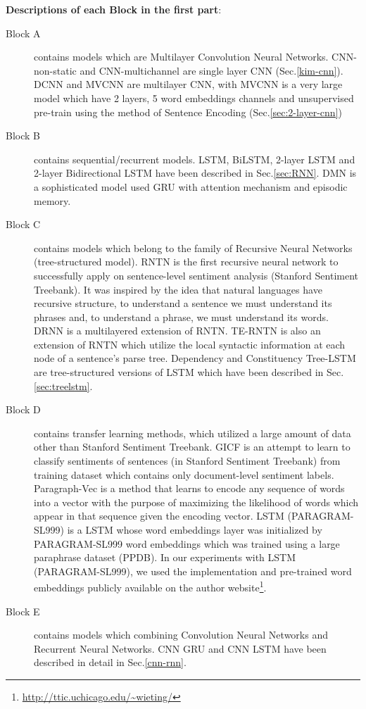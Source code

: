 \textbf{Descriptions of each Block in the first part}:
\begin{description}
\item[Block A] contains models which are Multilayer Convolution Neural Networks.  
CNN-non-static and CNN-multichannel\cite{KimCNN} are single layer CNN (Sec.\ref{kim-cnn}).
DCNN\cite{DCNN} and MVCNN\cite{2-layer-cnn} are multilayer CNN, with MVCNN is a very large model  which have 2 layers, 5 word embeddings channels and unsupervised pre-train using the method of Sentence Encoding (Sec.\ref{sec:2-layer-cnn})
\item[Block B] contains sequential/recurrent models. 
 LSTM\cite{originLSTM}, BiLSTM\cite{GravesLSTM}, 2-layer LSTM\cite{GravesLSTM} and 2-layer Bidirectional LSTM\cite{GravesLSTM} have been described in Sec.\ref{sec:RNN}.
DMN\cite{attention-gru} is a sophisticated model used GRU with attention mechanism and episodic memory.
\item[Block C] contains models which belong to the family of Recursive Neural Networks (tree-structured model). 
RNTN\cite{socher2013recursive} is the first recursive neural network to successfully apply on sentence-level sentiment analysis (Stanford Sentiment Treebank). 
It was inspired by the idea that natural languages have recursive structure, to understand a sentence we must understand its phrases and, to understand a phrase, we must understand its words. 
DRNN\cite{IrsoyDRNN} is a multilayered extension of RNTN.
TE-RNTN is also an extension of RNTN which utilize the local syntactic information at each node of a sentence's parse tree.
Dependency and Constituency Tree-LSTM\cite{treeLSTM} are tree-structured versions of LSTM which have been described in Sec.\ref{sec:treelstm}.
 
\item[Block D] contains transfer learning methods, which utilized a large amount of data other than Stanford Sentiment Treebank.
GICF\cite{group-instance} is an attempt to learn to classify sentiments of sentences (in Stanford Sentiment Treebank) from training dataset which contains only document-level sentiment labels.
Paragraph-Vec\cite{ParagraphVec} is a method that learns to encode any sequence of words into a vector with the purpose of maximizing the likelihood of words which appear in that sequence given the encoding vector.
LSTM (PARAGRAM-SL999)\cite{wieting2015towards} is a LSTM whose word embeddings layer was initialized by PARAGRAM-SL999 word embeddings which was trained using a large paraphrase dataset (PPDB\cite{ganitkevitch2013ppdb}).
In our experiments with LSTM (PARAGRAM-SL999), we used the implementation and pre-trained word embeddings publicly available on the author website\footnote{\url{http://ttic.uchicago.edu/~wieting/}}.
 
\item[Block E] contains models which combining Convolution Neural Networks and Recurrent Neural Networks. 
CNN GRU and CNN LSTM\cite{cnn-rnn} have been described in detail in Sec.\ref{cnn-rnn}.
\end{description} 


